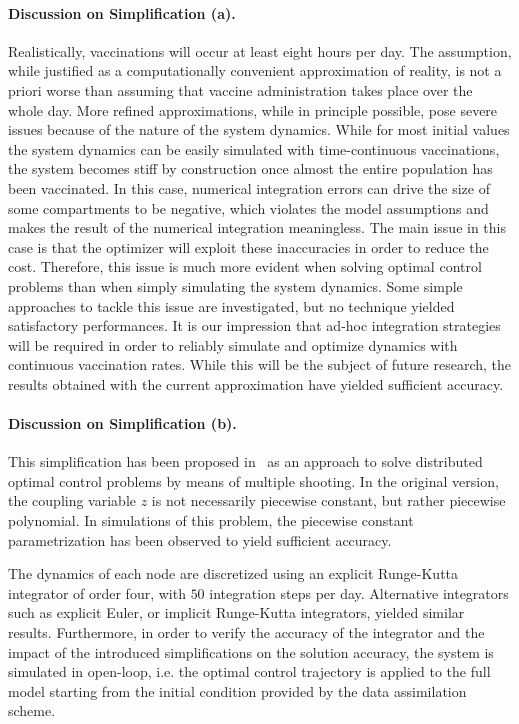 \paragraph{Discussion on Simplification (a).}
Realistically, vaccinations will occur at least eight hours per day. The assumption, while justified as a computationally convenient approximation of reality, is not a priori worse than assuming that vaccine administration takes place over the whole day. More refined approximations, while in principle possible, pose severe issues because of the nature of the system dynamics. While for most initial values the system dynamics can be easily simulated with time-continuous vaccinations, the system becomes stiff by construction once almost the entire population has been vaccinated. In this case, numerical integration errors can drive the size of some compartments to be negative, which violates the model assumptions and makes the result of the numerical integration meaningless. The main issue in this case is that the optimizer will exploit these inaccuracies in order to reduce the cost. Therefore, this issue is much more evident when solving optimal control problems than when simply simulating the system dynamics. Some simple approaches to tackle this issue are investigated, but no technique yielded satisfactory performances. It is our impression that ad-hoc integration strategies will be required in order to reliably simulate and optimize dynamics with continuous vaccination rates. While this will be the subject of future research, the results obtained with the current approximation have yielded sufficient accuracy.

\paragraph{Discussion on Simplification (b).}
This simplification has been proposed in~\cite{Savorgnan:MultipleShootingDistributed:2011} as an approach to solve distributed optimal control problems by means of multiple shooting. In the original version, the coupling variable $z$ is not necessarily piecewise constant, but rather piecewise polynomial. In simulations of this problem, the piecewise constant parametrization has been observed to yield sufficient accuracy.

The dynamics of each node are discretized using an explicit Runge-Kutta integrator of order four, with $50$ integration steps per day. Alternative integrators such as explicit Euler, or implicit Runge-Kutta integrators, yielded similar results. Furthermore, in order to verify the accuracy of the integrator and the impact of the introduced simplifications on the solution accuracy, the system is simulated in open-loop, i.e. the optimal control trajectory is applied to the full model starting from the initial condition provided by the data assimilation scheme.

